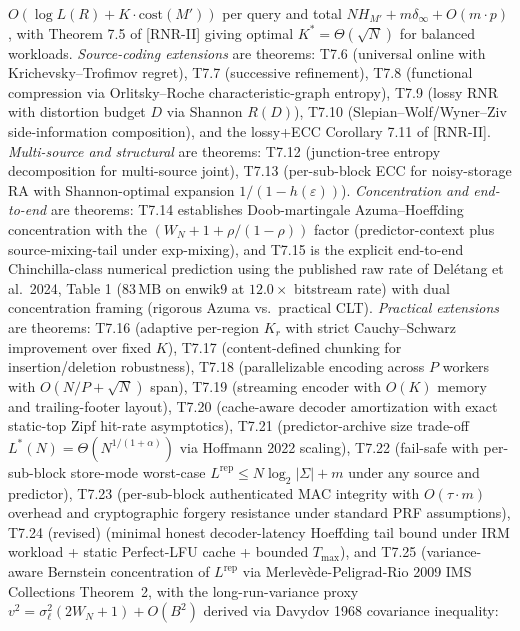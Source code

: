 \documentclass[
]{article}
\begin{document}
\begin{itemize}
  $O(\log L(R) + K \cdot \mathrm{cost}(M'))$ per query and total
  $N H_{M'} + m \delta_\infty + O(m \cdot p)$, with Theorem 7.5 of [RNR-II]
  giving optimal $K^* = \Theta(\sqrt{N})$ for balanced workloads.
  \emph{Source-coding extensions} are theorems: T7.6 (universal
  online with Krichevsky--Trofimov regret), T7.7 (successive
  refinement), T7.8 (functional compression via Orlitsky--Roche
  characteristic-graph entropy), T7.9 (lossy RNR with distortion
  budget $D$ via Shannon $R(D)$), T7.10 (Slepian--Wolf/Wyner--Ziv
  side-information composition), and the lossy+ECC
  Corollary 7.11 of [RNR-II]. \emph{Multi-source and structural} are theorems:
  T7.12 (junction-tree entropy decomposition for multi-source
  joint), T7.13 (per-sub-block ECC for noisy-storage RA with
  Shannon-optimal expansion $1/(1 - h(\varepsilon))$). \emph{Concentration
  and end-to-end} are theorems: T7.14 establishes Doob-martingale
  Azuma--Hoeffding concentration with the
  $(W_N + 1 + \rho/(1-\rho))$ factor (predictor-context plus
  source-mixing-tail under exp-mixing), and T7.15 is the explicit
  end-to-end Chinchilla-class numerical prediction using the published raw rate
  of Delétang et al.\ 2024, Table 1 ($83\,\mathrm{MB}$ on enwik9 at
  $12.0\times$ bitstream rate) with dual concentration framing
  (rigorous Azuma vs.\ practical CLT). \emph{Practical extensions}
  are theorems: T7.16 (adaptive per-region $K_r$ with strict
  Cauchy--Schwarz improvement over fixed $K$), T7.17
  (content-defined chunking for insertion/deletion robustness),
  T7.18 (parallelizable encoding across $P$ workers with
  $O(N/P + \sqrt{N})$ span), T7.19 (streaming encoder with $O(K)$
  memory and trailing-footer layout), T7.20 (cache-aware decoder
  amortization with exact static-top Zipf hit-rate asymptotics),
  T7.21 (predictor-archive size trade-off
  $L^*(N) = \Theta(N^{1/(1+\alpha)})$ via Hoffmann 2022 scaling),
  T7.22 (fail-safe with per-sub-block store-mode worst-case
  $L^{\mathrm{rep}} \leq N \log_2 |\Sigma| + m$ under any source
  and predictor), T7.23 (per-sub-block authenticated MAC integrity
  with $O(\tau \cdot m)$ overhead and cryptographic forgery
  resistance under standard PRF assumptions), T7.24 (revised)
  (minimal honest decoder-latency Hoeffding tail bound under IRM
  workload + static Perfect-LFU cache + bounded $T_{\max}$), and
  T7.25 (variance-aware Bernstein concentration of
  $L^{\mathrm{rep}}$ via Merlev\`ede-Peligrad-Rio 2009 IMS Collections
  Theorem~2, with the long-run-variance proxy $v^2 = \sigma_\ell^2
  (2W_N + 1) + O(B^2)$ derived via Davydov 1968 covariance inequality:

\end{itemize}
\end{document}
